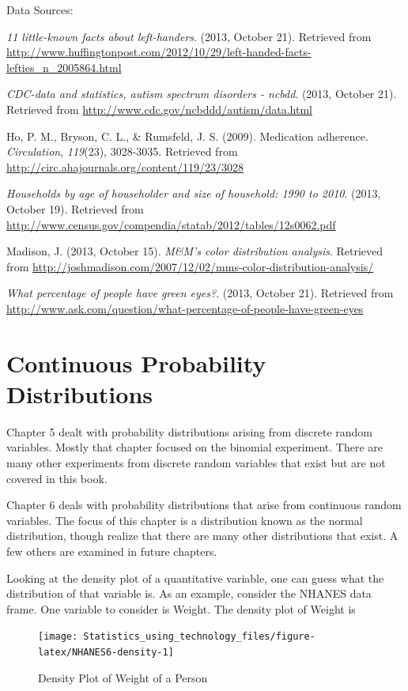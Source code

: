 \documentclass[
]{book}
\begin{document}
Data Sources:

\emph{11 little-known facts about left-handers}. (2013, October 21).
Retrieved from
\url{http://www.huffingtonpost.com/2012/10/29/left-handed-facts-lefties_n_2005864.html}

\emph{CDC-data and statistics, autism spectrum disorders - ncbdd}. (2013,
October 21). Retrieved from \url{http://www.cdc.gov/ncbddd/autism/data.html}

Ho, P. M., Bryson, C. L., \& Rumsfeld, J. S. (2009). Medication
adherence. \emph{Circulation}, \emph{119}(23), 3028-3035. Retrieved from
\url{http://circ.ahajournals.org/content/119/23/3028}

\emph{Households by age of householder and size of household: 1990 to 2010}.
(2013, October 19). Retrieved from
\url{http://www.census.gov/compendia/statab/2012/tables/12s0062.pdf}

Madison, J. (2013, October 15). \emph{M\&M's color distribution analysis}.
Retrieved from
\url{http://joshmadison.com/2007/12/02/mms-color-distribution-analysis/}

\emph{What percentage of people have green eyes?}. (2013, October 21).
Retrieved from
\url{http://www.ask.com/question/what-percentage-of-people-have-green-eyes}

\hypertarget{continuous-probability-distributions}{%
\chapter{Continuous Probability Distributions}\label{continuous-probability-distributions}}

Chapter 5 dealt with probability distributions arising from discrete random variables. Mostly that chapter focused on the binomial experiment. There are many other experiments from discrete random variables that exist but are not covered in this book.

Chapter 6 deals with probability distributions that arise from continuous random variables. The focus of this chapter is a distribution known as the normal distribution, though realize that there are many other distributions that exist. A few others are examined in future chapters.

Looking at the density plot of a quantitative variable, one can guess what the distribution of that variable is. As an example, consider the NHANES data frame. One variable to consider is Weight. The density plot of Weight is



\begin{figure}
\texttt{[image: Statistics\_using\_technology\_files/figure-latex/NHANES6-density-1]} \caption{Density Plot of Weight of a Person}\label{fig:NHANES6-density}
\end{figure}
\end{document}

